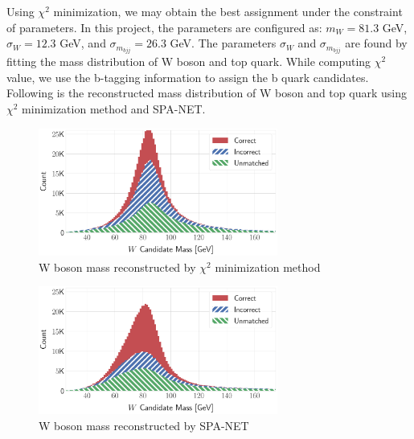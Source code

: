 Using $\chi^{2}$ minimization, we may obtain the best assignment under the constraint of parameters. In this project, the parameters are configured as: $m_{W}=81.3$ GeV, $\sigma_{W} = 12.3$ GeV, and $\sigma_{m_{bjj}}=26.3$ GeV. The parameters $\sigma_{W}$ and $\sigma_{m_{bjj}}$ are found by fitting the mass distribution of W boson and top quark. While computing $\chi^{2}$ value, we use the b-tagging information to assign the b quark candidates. 
\\
Following is the reconstructed mass distribution of W boson and top quark using $\chi^{2}$ minimization method and SPA-NET.
\\
\begin{figure}[H]
	\centering
	\includegraphics[width=0.7\textwidth]{Figures/network_w_quark_stacked_chi2.pdf}
	\caption{W boson mass reconstructed by $\chi^{2}$ minimization method}
	\label{fig: chi2 reco Wboson}
\end{figure}
\begin{figure}[H]
	\centering
	\includegraphics[width=0.7\textwidth]{Figures/network_w_quark_stacked.pdf}
	\caption{W boson mass reconstructed by SPA-NET}
	\label{fig: spanet reco Wboson}
\end{figure}

